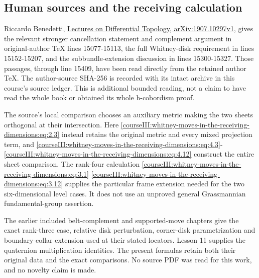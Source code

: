 \subsection{Human sources and the receiving calculation}
\label{courseIII:whitney-moves-in-the-receiving-dimensions:receiving-whitney-sources}

\label{courseIII:whitney-moves-in-the-receiving-dimensions:section-6}

Riccardo Benedetti, \href{https://arxiv.org/abs/1907.10297v1}{Lectures on Differential Topology, arXiv:1907.10297v1}, gives the relevant stronger cancellation statement and complement argument in original-author TeX lines 15077-15113, the full Whitney-disk requirement in lines 15152-15207, and the subbundle-extension discussion in lines 15300-15327. Those passages, through line 15409, have been read directly from the retained author TeX. The author-source SHA-256 is recorded with its intact archive in this course's source ledger. This is additional bounded reading, not a claim to have read the whole book or obtained its whole h-cobordism proof.

The source's local comparison chooses an auxiliary metric making the two sheets orthogonal at their intersection. Here \eqref{courseIII:whitney-moves-in-the-receiving-dimensions:eq:2.3} instead retains the original metric and every mixed projection term, and \eqref{courseIII:whitney-moves-in-the-receiving-dimensions:eq:4.3}-\eqref{courseIII:whitney-moves-in-the-receiving-dimensions:eq:4.12} construct the entire sheet comparison. The rank-four calculation \eqref{courseIII:whitney-moves-in-the-receiving-dimensions:eq:3.1}-\eqref{courseIII:whitney-moves-in-the-receiving-dimensions:eq:3.12} supplies the particular frame extension needed for the two six-dimensional level cases. It does not use an unproved general Grassmannian fundamental-group assertion.

The earlier included belt-complement and supported-move chapters give the exact rank-three case, relative disk perturbation, corner-disk parametrization and boundary-collar extension used at their stated locators. Lesson 11 supplies the quaternion multiplication identities. The present formulas retain both their original data and the exact comparisons. No source PDF was read for this work, and no novelty claim is made.

